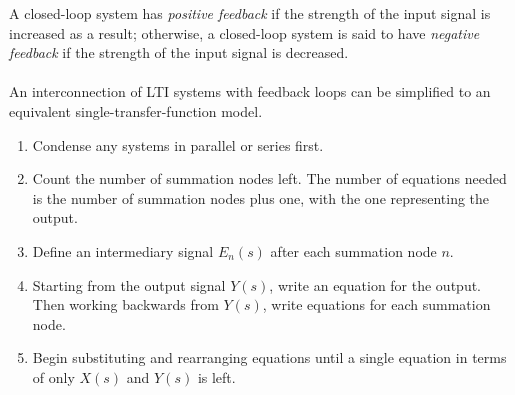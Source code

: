 \documentclass{report}
\begin{document}
A closed-loop system has \emph{positive feedback} if the strength of the input signal is increased as a result; otherwise, a closed-loop system is said to have \emph{negative feedback} if the strength 
of the input signal is decreased. 
\\ \\
An interconnection of LTI systems with feedback loops can be simplified to an equivalent single-transfer-function model.
\begin{enumerate}
    \item Condense any systems in parallel or series first.
    \item Count the number of summation nodes left. The number of equations needed is the number of summation nodes plus one, with the one representing the output.
    \item Define an intermediary signal $E_n(s)$ after each summation node $n$.
    \item Starting from the output signal $Y(s)$, write an equation for the output. Then working backwards from $Y(s)$, write equations for each summation node.
    \item Begin substituting and rearranging equations until a single equation in terms of only $X(s)$ and $Y(s)$ is left.
\end{enumerate}
\end{document}
